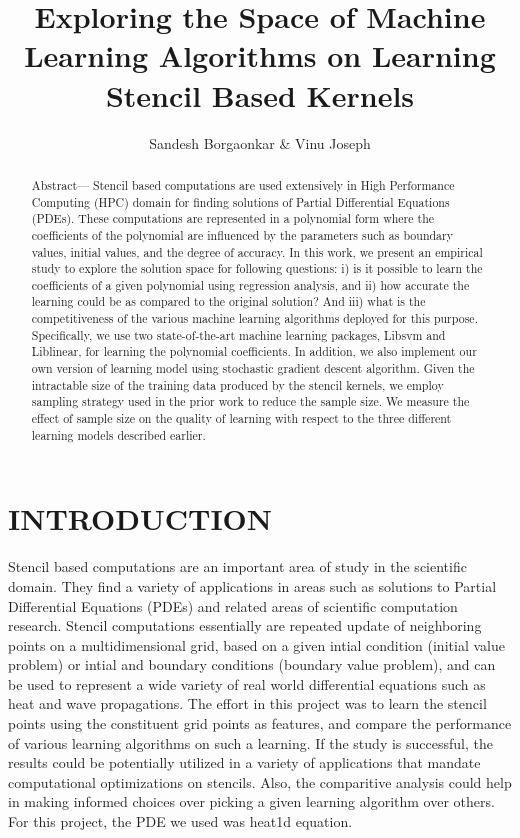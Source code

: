 \documentclass[letterpaper, 11 pt, conference]{ieeeconf}
\title{\LARGE \bf
Exploring the Space of Machine Learning Algorithms on Learning Stencil Based Kernels
}
\author{Sandesh Borgaonkar \& Vinu Joseph}%
\begin{document}
\maketitle
\thispagestyle{empty}
\pagestyle{empty}

\begin{abstract}
Abstract— Stencil based computations are used extensively in High Performance Computing (HPC) domain for finding
solutions of Partial Differential Equations (PDEs). These computations are represented in a polynomial form where the coefficients of the polynomial are influenced by the parameters such as boundary values, initial values, and the degree of accuracy. In this work, we present an empirical study to explore the solution space for following questions: i) is it possible to learn the coefficients of a given polynomial using regression analysis, and ii) how accurate the learning could be as compared to the original solution? And iii) what is the competitiveness of the various machine learning algorithms deployed for this purpose. Specifically, we use two state-of-the-art
machine learning packages, Libsvm and Liblinear, for learning the polynomial coefficients. In addition, we also implement our own version of learning model using stochastic gradient descent algorithm. Given the intractable size of the training data produced by the stencil kernels, we employ sampling strategy used in the prior work to reduce the sample size. We measure the effect of sample size on the quality of learning with respect to the three  different learning models described earlier.
\end{abstract}


\section{INTRODUCTION}
Stencil based computations are an important area of study in the scientific domain. They find a variety of applications in areas such as solutions to Partial Differential Equations (PDEs) and related areas of scientific computation research. Stencil computations essentially are repeated update of neighboring points on a multidimensional grid, based on a given intial condition (initial value problem) or intial and boundary conditions (boundary value problem), and can be used to represent a wide variety of real world differential equations such as heat and wave propagations. The effort in this project was to learn the stencil points using the constituent grid points as features, and compare the performance of various learning algorithms on such a learning. If the study is successful, the results could be potentially utilized in a variety of applications that mandate computational optimizations on stencils. Also, the comparitive analysis could help in making informed choices over picking a given learning algorithm over others. For this project, the PDE we used was heat1d equation.
\end{document}
